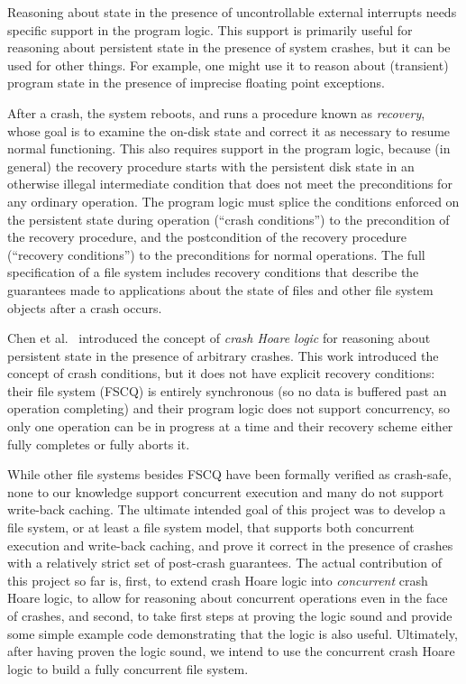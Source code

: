 Reasoning about state in the presence of uncontrollable external
interrupts needs
specific support in the program logic.
This support is primarily useful for reasoning about persistent state
in the presence of system crashes, but it can be used for other
things.
For example, one might use it to reason about (transient) program
state in the presence of imprecise floating point exceptions.

After a crash, the system reboots, and runs a procedure
known as \emph{recovery}, whose goal is to examine the on-disk state
and correct it as necessary to resume normal functioning.
This also requires support in the program logic, because (in general)
the recovery procedure starts with the persistent disk state in an
otherwise illegal intermediate condition that does not meet the
preconditions for any ordinary operation.
The program logic must splice the conditions enforced on the
persistent state during operation (``crash conditions'') to the
precondition of the recovery procedure, and the postcondition of the
recovery procedure (``recovery conditions'') to the preconditions for
normal operations.
The full specification of a file system includes recovery conditions
that describe the guarantees made to applications about the state of
files and other file system objects after a crash occurs.

Chen et al.~\cite{chen2015using} introduced the concept of \emph{crash
Hoare logic} for reasoning about persistent state in the presence of
arbitrary crashes.
This work introduced the concept of crash conditions, but it does not
have explicit recovery conditions: their file system (FSCQ) is
entirely synchronous (so no data is buffered past an operation
completing) and their program logic does not support concurrency, so
only one operation can be in progress at a time and their recovery
scheme either fully completes or fully aborts it.

While other file systems besides FSCQ have been formally verified as
crash-safe, none to our knowledge support concurrent execution and
many do not support write-back caching.
The ultimate intended goal of this project was to develop a file
system, or at least a file system model, that supports both concurrent
execution and write-back caching, and prove it correct in the presence
of crashes with a relatively strict set of post-crash guarantees.
The actual contribution of this project so far is, first, to extend
crash Hoare logic into \emph{concurrent} crash Hoare logic, to allow
for reasoning about concurrent operations even in the face of crashes,
and second, to take first steps at proving the
logic sound and provide some simple example code demonstrating that
the logic is also useful.
Ultimately, after having proven the logic sound, we intend to use the
concurrent crash Hoare logic to build a fully concurrent file system.

